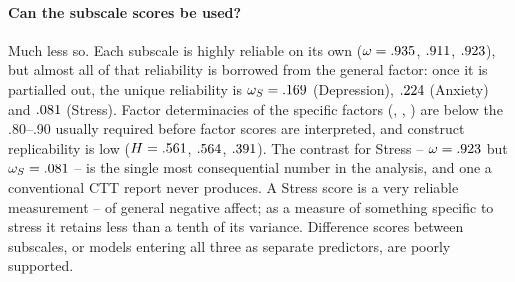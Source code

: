 \documentclass[11pt,a4paper]{article}
\begin{document}
\paragraph{Can the subscale scores be used?} Much less so. Each subscale is highly
reliable on its own ($\omega=.935$, $.911$, $.923$), but
almost all of that reliability is borrowed from the general factor: once it is partialled
out, the unique reliability is $\omega_S=.169$ (Depression),
$.224$ (Anxiety) and $.081$ (Stress). Factor determinacies of the
specific factors (\FDDepression, \FDAnxiety, \FDStress) are below the .80--.90 usually
required before factor scores are interpreted, and construct replicability is low
($H=.561$, $.564$, $.391$). The contrast for Stress --
$\omega=.923$ but $\omega_S=.081$ -- is the single most consequential
number in the analysis, and one a conventional CTT report never produces. A Stress score
is a very reliable measurement -- of general negative affect; as a measure of something
specific to stress it retains less than a tenth of its variance. Difference scores
between subscales, or models entering all three as separate predictors, are poorly
supported.
\end{document}
